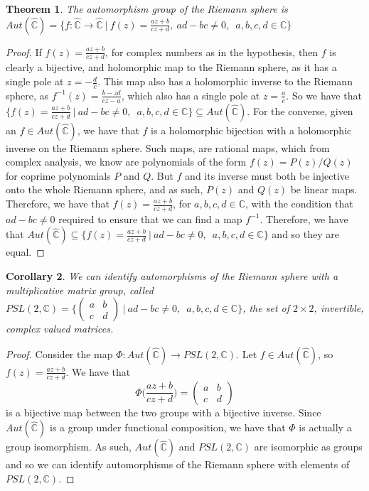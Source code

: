 \documentclass[11pt]{report}
\newtheorem{thm}{Theorem}[section]
\newtheorem{cor}[thm]{Corollary}
\theoremstyle{definition}
\begin{document}
\begin{thm}\label{AutSphere}
  The automorphism group of the Riemann sphere is ~\\
  $Aut(\widehat{\mathbb{C}}) = \bigl\{f:\widehat{\mathbb{C}} \rightarrow \widehat{\mathbb{C}} \ \vert \ f(z) = \frac{az+b}{cz+d}, \ ad-bc \neq 0, \enspace a, b, c ,d \in \mathbb{C}\bigr\}$
\end{thm}
\begin{proof}
  If $f(z)=\frac{az+b}{cz+d}$, for complex numbers as in the hypothesis, then $f$ is clearly a bijective, and holomorphic map to the Riemann sphere, as it has a single pole at $z = -\frac{d}{c}$. This map also has a holomorphic inverse to the Riemann sphere, as $f^{-1}(z) = \frac{b-zd}{cz-a}$, which also has a single pole at $z=\frac{a}{c}$. So we have that $\bigl\{f(z) = \frac{az+b}{cz+d}\ \vert \ ad-bc \neq 0, \enspace a, b, c ,d \in \mathbb{C}\bigr\} \subseteq Aut(\widehat{\mathbb{C}})$. For the converse, given an $f \in Aut(\widehat{\mathbb{C}})$, we have that $f$ is a holomorphic bijection with a holomorphic inverse on the Riemann sphere. Such maps, are rational maps, which from complex analysis, we know are polynomials of the form $f(z)=P(z)/Q(z)$ for coprime polynomials $P$ and $Q$. But $f$ and its inverse must both be injective onto the whole Riemann sphere, and as such, $P(z)$ and $Q(z)$ be linear maps. Therefore, we have that $f(z)=\frac{az+b}{cz+d}$, for $a,b,c,d \in \mathbb{C}$, with the condition that $ad-bc \neq 0$ required to ensure that we can find a map $f^{-1}$. Therefore, we have that $Aut(\widehat{\mathbb{C}}) \subseteq \bigl\{f(z) = \frac{az+b}{cz+d}\ \vert \ ad-bc \neq 0, \enspace a, b, c ,d \in \mathbb{C}\bigr\}$ and so they are equal.
\end{proof} 
\begin{cor}
  We can identify automorphisms of the Riemann sphere with a multiplicative matrix group, called $PSL(2,\mathbb{C}) = \Bigg\{ \begin{pmatrix} a & b\\ c & d \end{pmatrix} \ \Bigg\vert \ ad-bc \neq 0, \enspace a, b, c ,d \in \mathbb{C}\Bigg\}$, the set of $2\times 2$, invertible, complex valued matrices. 
\end{cor}
\begin{proof}
  Consider the map $\Phi : Aut(\widehat{\mathbb{C}}) \rightarrow PSL(2,\mathbb{C})$. Let $f \in Aut(\widehat{\mathbb{C}})$, so $f(z) = \frac{az+b}{cz+d}$. We have that \[\Phi\Big(\frac{az+b}{cz+d}\Big) = \begin{pmatrix} a & b\\ c & d \end{pmatrix}\] is a bijective map between the two groups with a bijective inverse. Since $Aut(\widehat{\mathbb{C}})$ is a group under functional composition, we have that $\Phi$ is actually a group isomorphism. As such, $Aut(\widehat{\mathbb{C}})$ and $PSL(2,\mathbb{C})$ are isomorphic as groups and so we can identify automorphisms of the Riemann sphere with elements of $PSL(2,\mathbb{C})$. 
\end{proof}
\end{document}
